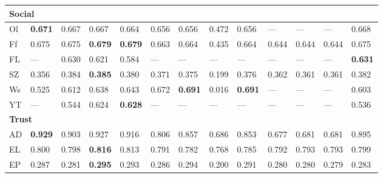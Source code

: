\begin{longtable}{ lllllllllllll }
\hline
\multicolumn{13}{|l|}{\textbf{Social}} \\
\hline
\textsf{Ol}                   & \bf{0.671} & 0.667 & 0.667 & 0.664 & 0.656 & 0.656 & 0.472 & 0.656 & --- & --- & --- & 0.668 \\
\textsf{Ff}                   & 0.675 & 0.675 & \bf{0.679} & \bf{0.679} & 0.663 & 0.664 & 0.435 & 0.664 & 0.644 & 0.644 & 0.644 & 0.675 \\
\textsf{FL}                   & --- & 0.630 & 0.621 & 0.584 & --- & --- & --- & --- & --- & --- & --- & \bf{0.631} \\
\textsf{SZ}                   & 0.356 & 0.384 & \bf{0.385} & 0.380 & 0.371 & 0.375 & 0.199 & 0.376 & 0.362 & 0.361 & 0.361 & 0.382 \\
\textsf{Ws}                   & 0.525 & 0.612 & 0.638 & 0.643 & 0.672 & \bf{0.691} & 0.016 & \bf{0.691} & --- & --- & --- & 0.603 \\
\textsf{YT}                   & --- & 0.544 & 0.624 & \bf{0.628} & --- & --- & --- & --- & --- & --- & --- & 0.536 \\

\hline
\multicolumn{13}{|l|}{\textbf{Trust}} \\
\hline
\textsf{AD}                   & \bf{0.929} & 0.903 & 0.927 & 0.916 & 0.806 & 0.857 & 0.686 & 0.853 & 0.677 & 0.681 & 0.681 & 0.895 \\
\textsf{EL}                   & 0.800 & 0.798 & \bf{0.816} & 0.813 & 0.791 & 0.782 & 0.768 & 0.785 & 0.792 & 0.793 & 0.793 & 0.799 \\
\textsf{EP}                   & 0.287 & 0.281 & \bf{0.295} & 0.293 & 0.286 & 0.294 & 0.200 & 0.291 & 0.280 & 0.280 & 0.279 & 0.283 \\

      \hline
    \end{longtable} 


